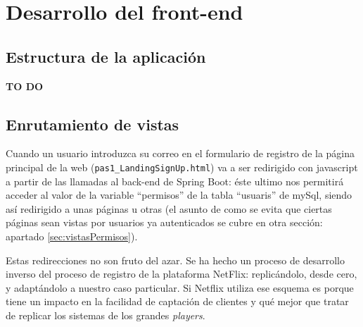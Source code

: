 \documentclass[a4paper,12pt]{report}
\begin{document}
	
	\section{Desarrollo del front-end}
	
	\subsection{Estructura de la aplicación}
	\label{sec:estructuraAplicacionFrontEnd}
	
	\textbf{TO DO}
	
	\subsection{Enrutamiento de vistas}
	\label{sec:EnrutamientoDeVistas}
	
	Cuando un usuario introduzca su correo en el formulario de registro de la página principal de la web (\texttt{pas1\_LandingSignUp.html}) va a ser redirigido con javascript a partir de las llamadas al back-end de Spring Boot: éste ultimo nos permitirá acceder al valor de la variable ``permisos'' de la tabla ``usuaris'' de mySql, siendo así redirigido a unas páginas u otras (el asunto de como se evita que ciertas páginas sean vistas por usuarios ya autenticados se cubre en otra sección: apartado \ref{sec:vistasPermisos}).
	
	

	
	Estas redirecciones no son fruto del azar. Se ha hecho un proceso de desarrollo inverso del proceso de registro de la plataforma NetFlix: replicándolo, desde cero, y adaptándolo a nuestro caso particular. Si Netflix utiliza ese esquema es porque tiene un impacto en la facilidad de captación de clientes y qué mejor que tratar de replicar los sistemas de los grandes \textit{players}.
	
\end{document}
